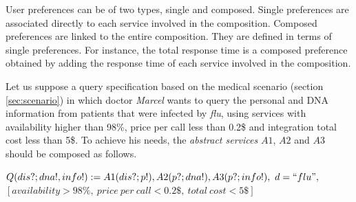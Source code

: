 User preferences can be of two types, single and composed. Single preferences
are associated directly to each service involved in the composition. Composed
preferences are linked to the entire composition. They are defined in terms of
single preferences. For instance, the total response time is a composed
preference obtained by adding the response time of each service involved in the composition.

Let us suppose a query specification based on the medical scenario (section \ref{sec:scenario}) in which doctor \textit{Marcel} wants to query the personal and DNA information from patients that were infected by \textit{flu}, using services with availability higher than 98\%, price per call less than 0.2\$ and integration total cost less than 5\$.
To achieve his needs, the \textit{abstract services} $A1$, $A2$ and $A3$ should be composed as follows. 

\begin{center}
\small
$Q(dis?; dna!, info!) := A1(dis?; p!), A2(p?; dna!), A3(p?; info!), \ d = ``flu" , $
\\
$[availability > 98\%, \ price \ per \ call < 0.2\$, \ total \ cost < 5\$]$
\end{center}


